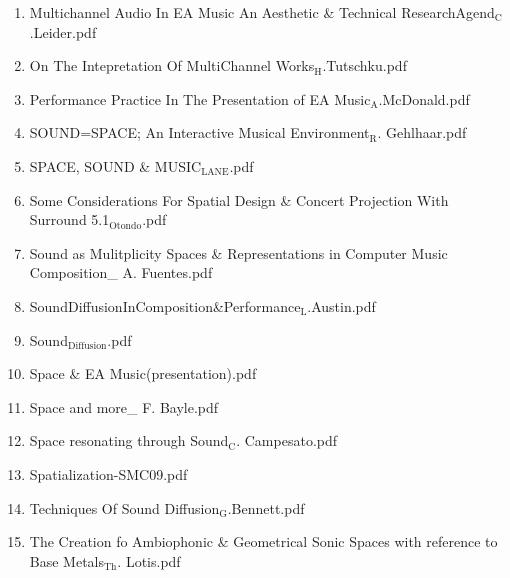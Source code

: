 \documentclass[11pt]{article}
\begin{document}
\begin{enumerate}
\item Multichannel Audio In EA Music An Aesthetic \& Technical ResearchAgend$_{\text{C}}$.Leider.pdf
\label{sec-1-1-1-1-49-1-8-14}

\item On The Intepretation Of MultiChannel Works$_{\text{H}}$.Tutschku.pdf
\label{sec-1-1-1-1-49-1-8-15}

\item Performance Practice In The Presentation of EA Music$_{\text{A}}$.McDonald.pdf
\label{sec-1-1-1-1-49-1-8-16}

\item SOUND=SPACE; An Interactive Musical Environment$_{\text{R}}$. Gehlhaar.pdf
\label{sec-1-1-1-1-49-1-8-17}

\item SPACE, SOUND \& MUSIC$_{\text{LANE}}$.pdf
\label{sec-1-1-1-1-49-1-8-18}

\item Some Considerations For Spatial Design \& Concert Projection With Surround 5.1$_{\text{Otondo}}$.pdf
\label{sec-1-1-1-1-49-1-8-19}

\item Sound as Mulitplicity Spaces \& Representations in Computer Music Composition\_ A. Fuentes.pdf
\label{sec-1-1-1-1-49-1-8-20}

\item SoundDiffusionInComposition\&Performance$_{\text{L}}$.Austin.pdf
\label{sec-1-1-1-1-49-1-8-21}

\item Sound$_{\text{Diffusion}}$.pdf
\label{sec-1-1-1-1-49-1-8-22}

\item Space \& EA Music(presentation).pdf
\label{sec-1-1-1-1-49-1-8-23}

\item Space and more\_ F. Bayle.pdf
\label{sec-1-1-1-1-49-1-8-24}

\item Space resonating through Sound$_{\text{C}}$. Campesato.pdf
\label{sec-1-1-1-1-49-1-8-25}

\item Spatialization-SMC09.pdf
\label{sec-1-1-1-1-49-1-8-26}

\item Techniques Of Sound Diffusion$_{\text{G}}$.Bennett.pdf
\label{sec-1-1-1-1-49-1-8-27}

\item The Creation fo Ambiophonic \& Geometrical Sonic Spaces with reference to Base Metals$_{\text{Th}}$. Lotis.pdf
\label{sec-1-1-1-1-49-1-8-28}


\end{enumerate}
\end{document}
